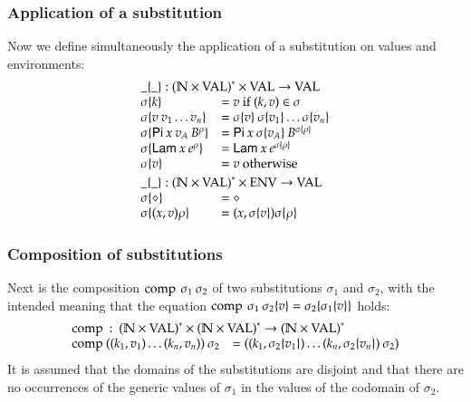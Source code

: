\subsubsection{Application of a substitution}
Now we define simultaneously the application of a substitution on values and environments:
\[
\begin{array}{ll}
\multicolumn{2}{l}{\subst{\_}{\_} : \ves{(\cN \times \Val)} \times \Val \ra \Val} \\
\subst{\sigma}{k} & = v \mbox{ if } (k,v) \in \sigma \\
\subst{\sigma}{v \: v_1 \ldots v_n} & = \subst{\sigma}{v} \: \subst{\sigma}{v_1} \ldots \subst{\sigma}{v_n}\\
\subst{\sigma}{\vpi \: x \: v_A \: \cl{B}{\rho}} & = \vpi \: x \: \subst{\sigma}{v_A} \: \cl{B}{\subst{\sigma}{\rho}} \\
\subst{\sigma}{\vlam \: x \: \cl{e}{\rho}} & = \vlam \: x \: \cl{e}{\subst{\sigma}{\rho}} \\
\subst{\sigma}{v} & = v \mbox{ otherwise }
\vs\\
\multicolumn{2}{l}{\substEnv{\_}{\_} : \ves{(\cN \times \Val)} \times \Env \ra \Val} \\
\substEnv{\sigma}{\diamond} & = \diamond \\
\substEnv{\sigma}{(x,v)\rho} & = (x,\subst{\sigma}{v}) \substEnv{\sigma}{\rho} \\
\end{array}
\]

\subsubsection{Composition of substitutions}
Next is the composition $\operatorname{comp}\:\sigma_1\:\sigma_2$ of two substitutions $\sigma_1$ and $\sigma_2$,
with the intended meaning that the equation $\operatorname{comp}\:\sigma_1\:\sigma_2\{v\} = \sigma_2\{\sigma_1\{v\}\}$ holds:
\[
\begin{array}{ll}
\multicolumn{2}{l}{\compS : \ves{(\cN \times \Val)} \times \ves{(\cN \times \Val)} \ra \ves{(\cN \times \Val)}} \\
\compS{((k_1,v_1)\ldots(k_n,v_n))}{\sigma_2} & = ((k_1,\subst{\sigma_2}{v_1})\ldots(k_n,\subst{\sigma_2}{v_n})\: \sigma_2) 
\end{array}
\]
It is assumed that the domains of the substitutions are disjoint and that there are no occurrences of the generic values of $\sigma_1$ in the values of the codomain of $\sigma_2$.  

